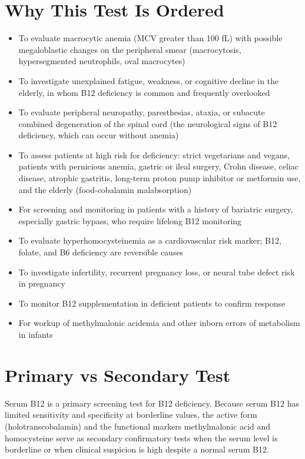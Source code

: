 \section*{Why This Test Is Ordered}
\begin{itemize}
  \item To evaluate macrocytic anemia (MCV greater than 100 fL) with possible megaloblastic changes on the peripheral smear (macrocytosis, hypersegmented neutrophils, oval macrocytes)
  \item To investigate unexplained fatigue, weakness, or cognitive decline in the elderly, in whom B12 deficiency is common and frequently overlooked
  \item To evaluate peripheral neuropathy, paresthesias, ataxia, or subacute combined degeneration of the spinal cord (the neurological signs of B12 deficiency, which can occur without anemia)
  \item To assess patients at high risk for deficiency: strict vegetarians and vegans, patients with pernicious anemia, gastric or ileal surgery, Crohn disease, celiac disease, atrophic gastritis, long-term proton pump inhibitor or metformin use, and the elderly (food-cobalamin malabsorption)
  \item For screening and monitoring in patients with a history of bariatric surgery, especially gastric bypass, who require lifelong B12 monitoring
  \item To evaluate hyperhomocysteinemia as a cardiovascular risk marker; B12, folate, and B6 deficiency are reversible causes
  \item To investigate infertility, recurrent pregnancy loss, or neural tube defect risk in pregnancy
  \item To monitor B12 supplementation in deficient patients to confirm response
  \item For workup of methylmalonic acidemia and other inborn errors of metabolism in infants
\end{itemize}

\section*{Primary vs Secondary Test}
Serum B12 is a primary screening test for B12 deficiency. Because serum B12 has limited sensitivity and specificity at borderline values, the active form (holotranscobalamin) and the functional markers methylmalonic acid and homocysteine serve as secondary confirmatory tests when the serum level is borderline or when clinical suspicion is high despite a normal serum B12.

